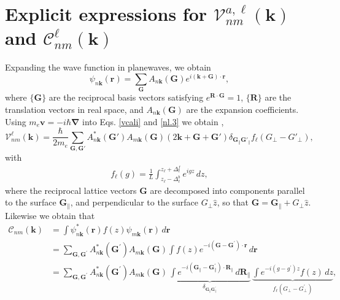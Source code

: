 \section{Explicit expressions for
\texorpdfstring{$\mathcal{V}^{a,\ell}_{nm}(\mathbf{k})$ and
$\mathcal{C}^{\ell}_{nm}(\mathbf{k})$}{Vnm and Cnm}}
\label{app:calpcalc}

Expanding the wave function in planewaves, we obtain
\begin{equation}\label{eni.1}
\psi_{n\mathbf{k}}(\mathbf{r})
= \sum_{\mathbf{G}}
A_{n\mathbf{k}}(\mathbf{G})e^{i(\mathbf{k}+\mathbf{G})\cdot\mathbf{r}},
\end{equation}
where $\{\mathbf{G}\}$ are the reciprocal basis vectors satisfying
$e^{\mathbf{R}\cdot\mathbf{G}} = 1$, $\{\mathbf{R}\}$ are the translation
vectors in real space, and $A_{n\mathbf{k}}(\mathbf{G})$ are the expansion
coefficients. Using $m_{e}\mathbf{v} = -i\hbar\boldsymbol{\nabla}$ into Eqs.
\eqref{vcali} and \eqref{nl.3} we obtain \cite{mendozaPRB06},
\begin{equation}\label{eni.2}
\boldsymbol{\mathcal{V}}^{\ell}_{nm}(\mathbf{k})=
\frac{\hbar}{2m_{e}}\sum_{\mathbf{G},\mathbf{G}'}
A^*_{n\mathbf{k}}(\mathbf{G}')A_{m\mathbf{k}}(\mathbf{G})
(2\mathbf{k}+\mathbf{G}+\mathbf{G}')
\delta_{\mathbf{G}_\parallel \mathbf{G}'_\parallel}f_{\ell}(G_\perp-G'_\perp),
\end{equation}   
with
\begin{align}\label{eni.3}
f_{\ell}(g) = \frac{1}{L}
\int_{z_{\ell}-\Delta^{b}_{\ell}}^{z_{\ell}+\Delta^{f}_{\ell}}
e^{igz}\,dz,
\end{align}
where the reciprocal lattice vectors $\mathbf{G}$ are decomposed into components
parallel to the surface $\mathbf{G}_{\parallel}$, and perpendicular to the
surface $G_{\perp}\hat{z}$, so that $\mathbf{G} = \mathbf{G}_{\parallel} +
G_{\perp}\hat{z}$. Likewise we obtain that
\begin{align*}
\mathcal{C}_{nm}(\mathbf{k})
&=  \int\psi^{*}_{n\mathbf{k}}(\mathbf{r})f(z)
    \psi_{m\mathbf{k}}(\mathbf{r})\,d\mathbf{r}\\
&=  \sum_{\mathbf{G},\mathbf{G^{\prime}}}
    A^{*}_{n\mathbf{k}}(\mathbf{G^{\prime}})
    A_{m\mathbf{k}}(\mathbf{G})
   \int f(z)e^{-i(\mathbf{G}-\mathbf{G^{\prime}})\cdot\mathbf{r}}\,d\mathbf{r}\\
&=  \sum_{\mathbf{G},\mathbf{G^{\prime}}}
    A^{*}_{n\mathbf{k}}(\mathbf{G^{\prime}})
    A_{m\mathbf{k}}(\mathbf{G})\,
    \underbrace{
    \int e^{-i(\mathbf{G}_{\parallel}-\mathbf{G}^{\prime}_{\parallel})
    \cdot\mathbf{R}_{\parallel}}\,d\mathbf{R}_{\parallel}
    }_{\delta_{\mathbf{G}_{\parallel}\mathbf{G}^{\prime}_{\parallel}}}
    \,\underbrace{
    \int e^{-i(g-g^{\prime})z}f(z)\,dz
    }_{f_{\ell}(G_{\perp} - G^{\prime}_{\perp})},
\end{align*}
